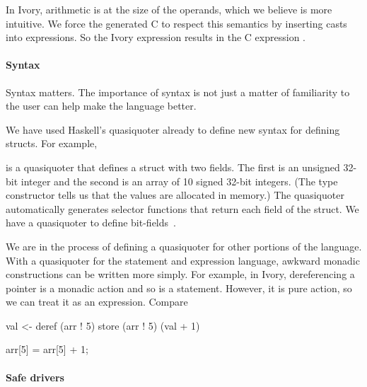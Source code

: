 In Ivory, arithmetic is at the size of the operands, which we believe is more
intuitive.  We force the generated C to respect this semantics by inserting
casts into expressions.  So the Ivory expression  results in the C
expression .

\paragraph{Syntax}
Syntax matters.  The importance of syntax is not just a matter of familiarity to
the user can help make the language better.

We have used Haskell's quasiquoter already to define new syntax
for defining structs.  For example,
\begin{code}
\end{code}
\noindent
is a quasiquoter that defines a struct  with two fields.  The first is
an unsigned 32-bit integer and the second is an array of 10 signed 32-bit
integers.  (The  type constructor tells us that the values are
allocated in memory.)  The quasiquoter automatically generates selector
functions that return each field of the struct.  We have a quasiquoter to define
bit-fields~\cite{high-level}.

We are in the process of defining a quasiquoter for other portions of the
language.  With a quasiquoter for the statement and expression language, awkward
monadic constructions can be written more simply.  For example, in Ivory,
dereferencing a pointer is a monadic action and so is a statement.  However, it
is pure action, so we can treat it as an expression.  Compare


\begin{code}
val <- deref (arr ! 5)
store (arr ! 5) (val + 1)
\end{code}

\begin{code}
arr[5] = arr[5] + 1;
\end{code}

\paragraph{Safe drivers}








